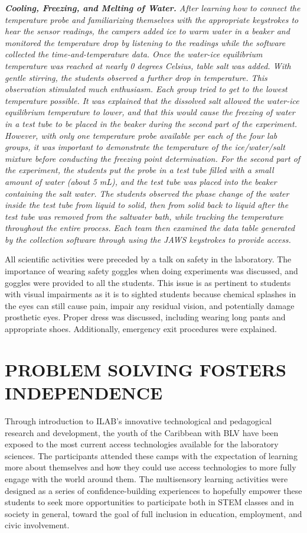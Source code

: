 \documentclass[11.5pt]{sig-alternate} %
\begin{document}
\begin{large}
\textit{\textbf{Cooling, Freezing, and Melting of Water.} After learning how to connect the temperature probe and familiarizing themselves with the appropriate keystrokes to hear the sensor readings, the campers added ice to warm water in a beaker and monitored the temperature drop by listening to the readings while the software collected the time-and-temperature data. Once the water-ice equilibrium temperature was reached at nearly 0 degrees Celsius, table salt was added. With gentle stirring, the students observed a further drop in temperature. This observation stimulated much enthusiasm. Each group tried to get to the lowest temperature possible. It was explained that the dissolved salt allowed the water-ice equilibrium temperature to lower, and that this would cause the freezing of water in a test tube to be placed in the beaker during the second part of the experiment. However, with only one temperature probe available per each of the four lab groups, it was important to demonstrate the temperature of the ice/water/salt mixture before conducting the freezing point determination. For the second part of the experiment, the students put the probe in a test tube filled with a small amount of water (about 5 mL), and the test tube was placed into the beaker containing the salt water. The students observed the phase change of the water inside the test tube from liquid to solid, then from solid back to liquid after the test tube was removed from the saltwater bath, while tracking the temperature throughout the entire process. Each team then examined the data table generated by the collection software through using the JAWS keystrokes to provide access.}

All scientific activities were preceded by a talk on safety in the laboratory. The importance of wearing safety goggles when doing experiments was discussed, and goggles were provided to all the students. This issue is as pertinent to students with visual impairments as it is to sighted students because chemical splashes in the eyes can still cause pain, impair any residual vision, and potentially damage prosthetic eyes. Proper dress was discussed, including wearing long pants and appropriate shoes. Additionally, emergency exit procedures were explained.

\section*{PROBLEM SOLVING FOSTERS INDEPENDENCE}
Through introduction to ILAB’s innovative technological and pedagogical research and development, the youth of the Caribbean with BLV have been exposed to the most current access technologies available for the laboratory sciences. The participants attended these camps with the expectation of learning more about themselves and how they could use access technologies to more fully engage with the world around them. The multisensory learning activities were designed as a series of confidence-building experiences to hopefully empower these students to seek more opportunities to participate both in STEM classes and in society in general, toward the goal of full inclusion in education, employment, and civic involvement.


\end{large}
\end{document}
